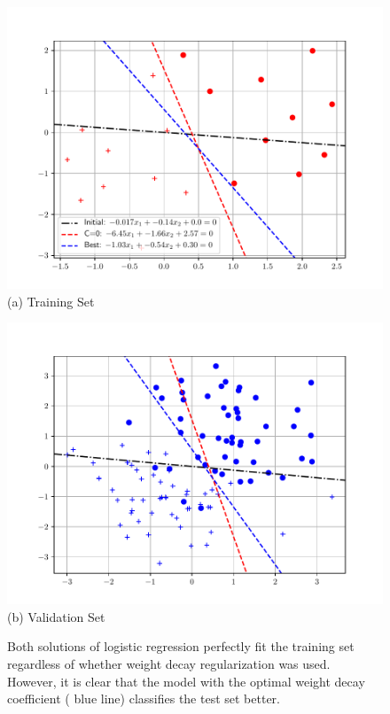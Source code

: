 \documentclass{report}
\begin{document}
\begin{figure}
    \centering
    \hfill
    \begin{minipage}{0.49\textwidth}
        \centering
        \includegraphics[width=\columnwidth]{figures/overfit2_tra.pdf}
        (a) Training Set
    \end{minipage}
    \hfill
    \begin{minipage}{0.49\textwidth}
        \centering
        \includegraphics[width=\columnwidth]{figures/overfit2_tes.pdf}
        (b) Validation Set
    \end{minipage}

    \caption{
        \label{fig:overfit}
        Both solutions of logistic regression perfectly fit the training set
        regardless of whether weight decay regularization was used. However, it
        is clear that the model with the optimal weight decay coefficient
        ({\color{blue} blue line})
        classifies the test set better. 
    }

\end{figure}
\end{document}
